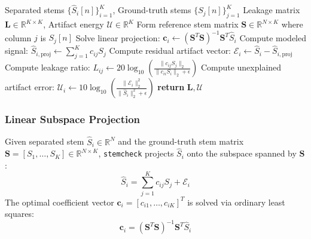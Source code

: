 \documentclass[10pt,journal,compsoc]{IEEEtran}
\begin{document}
\begin{algorithm}[t]
\caption{\texttt{stemcheck}: Linear Leakage Matrix Decomposition}
\label{alg:stemcheck}
\begin{algorithmic}[1]
\REQUIRE Separated stems $\{\hat{S}_i[n]\}_{i=1}^K$, Ground-truth stems $\{S_j[n]\}_{j=1}^K$
\ENSURE Leakage matrix $\mathbf{L} \in \mathbb{R}^{K \times K}$, Artifact energy $\mathcal{U} \in \mathbb{R}^K$
\STATE Form reference stem matrix $\mathbf{S} \in \mathbb{R}^{N \times K}$ where column $j$ is $S_j[n]$
    \STATE Solve linear projection: $\mathbf{c}_i \leftarrow (\mathbf{S}^T \mathbf{S})^{-1} \mathbf{S}^T \hat{S}_i$
    \STATE Compute modeled signal: $\hat{S}_{i, \text{proj}} \leftarrow \sum_{j=1}^K c_{ij} S_j$
    \STATE Compute residual artifact vector: $\mathcal{E}_i \leftarrow \hat{S}_i - \hat{S}_{i, \text{proj}}$
        \STATE Compute leakage ratio: $L_{ij} \leftarrow 20 \log_{10} \left( \frac{\|c_{ij} S_j\|_2}{\|c_{ii} S_i\|_2 + \epsilon} \right)$
    \ENDFOR
    \STATE Compute unexplained artifact error: $\mathcal{U}_i \leftarrow 10 \log_{10} \left( \frac{\|\mathcal{E}_i\|_2^2}{\|\hat{S}_i\|_2^2 + \epsilon} \right)$
\ENDFOR
\STATE \textbf{return} $\mathbf{L}, \mathcal{U}$
\end{algorithmic}
\end{algorithm}

\subsubsection{Linear Subspace Projection}
Given separated stem $\hat{S}_i \in \mathbb{R}^N$ and the ground-truth stem matrix $\mathbf{S} = [S_1, \dots, S_K] \in \mathbb{R}^{N \times K}$, \texttt{stemcheck} projects $\hat{S}_i$ onto the subspace spanned by $\mathbf{S}$:
\begin{equation}
\hat{S}_i = \sum_{j=1}^K c_{ij} S_j + \mathcal{E}_i
\label{eq:stem_proj}
\end{equation}
The optimal coefficient vector $\mathbf{c}_i = [c_{i1}, \dots, c_{iK}]^T$ is solved via ordinary least squares:
\begin{equation}
\mathbf{c}_i = (\mathbf{S}^T \mathbf{S})^{-1} \mathbf{S}^T \hat{S}_i
\label{eq:ols}
\end{equation}
\end{document}

